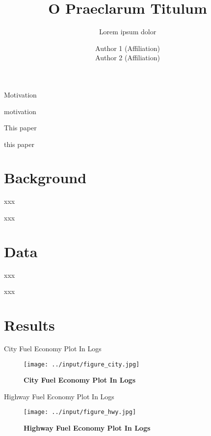 \documentclass[10pt,t,aspectratio=169]{beamer}
\title{O Praeclarum Titulum}
\subtitle{Lorem ipsum dolor}
\date{}
\author{Author 1 (Affiliation) \\
        Author 2 (Affiliation)}
\begin{document}
\maketitle

\begin{frame}{Motivation}

    motivation

\end{frame}

\begin{frame}{This paper}

    this paper
  
\end{frame}

\section{Background}

\begin{frame}{xxx}

    xxx
  
\end{frame}

\section{Data}

\begin{frame}{xxx}

    xxx
  
\end{frame}

\section{Results}

\begin{frame}{City Fuel Economy Plot In Logs}

	\begin{figure}[!htp]
    	\centering
   	 	\caption{\bf{City Fuel Economy Plot In Logs}}
   		\texttt{[image: ../input/figure\_city.jpg]}
	\end{figure}
  
\end{frame}

\begin{frame}{Highway Fuel Economy Plot In Logs}

	\begin{figure}[!htp]
    	\centering
   	 	\caption{\bf{Highway Fuel Economy Plot In Logs}}
   		\texttt{[image: ../input/figure\_hwy.jpg]}
	\end{figure}
  
\end{frame}
\end{document}
